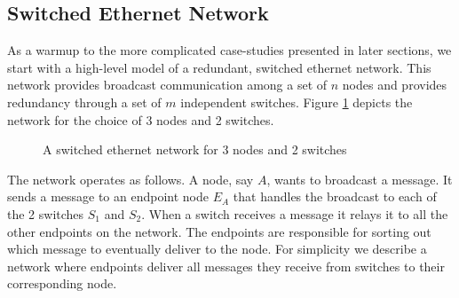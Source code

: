 \subsection{Switched Ethernet Network}
\label{ssec:swether}

As a warmup to the more complicated case-studies presented in later sections,
we start with a high-level model of a redundant, switched ethernet network.
This network provides broadcast communication among a set of $n$ nodes and
provides redundancy through a set of $m$ independent switches. Figure
\ref{fig:swether-diagram} depicts the network for the choice of 3 nodes and 2
switches.

\begin{figure}
\caption{A switched ethernet network for 3 nodes and 2 switches}
\label{fig:swether-diagram}
\end{figure}

The network operates as follows. A node, say $A$, wants to broadcast a
message. It sends a message to an endpoint node $E_A$ that handles the
broadcast to each of the 2 switches $S_1$ and $S_2$. When a switch receives a
message it relays it to all the other endpoints on the network. The endpoints
are responsible for sorting out which message to eventually deliver to the
node. For simplicity we describe a network where endpoints deliver all
messages they receive from switches to their corresponding node.

